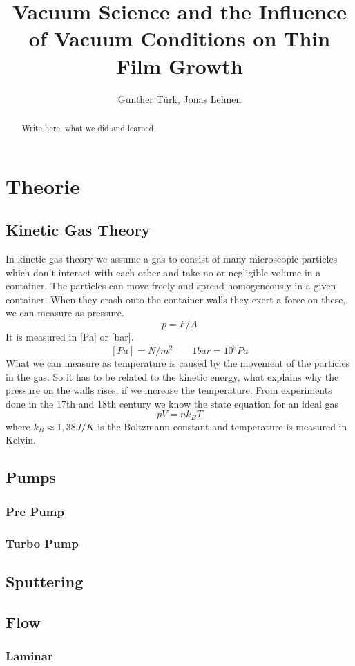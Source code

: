 \documentclass[]{article}
\title{Vacuum Science and the Inﬂuence of Vacuum Conditions on Thin Film Growth}
\author{Gunther Türk, Jonas Lehnen}
\begin{document}
\maketitle
\tableofcontents
\begin{abstract}
Write here, what we did and learned.
\end{abstract}

\section{Theorie}
\subsection{Kinetic Gas Theory}
In kinetic gas theory we assume a gas to consist of many microscopic particles which don't interact with each other and take no or negligible volume in a container. The particles can move freely and spread homogeneously in a given container. When they crash onto the container walls they exert a force on these, we can measure as pressure. 
\[ p=F/A \]
It is measured in [Pa] or [bar].
\[ [Pa]=N/m^{2}     \qquad  1bar=10^{5}Pa		 \]
What we can measure as temperature is caused by the movement of the particles in the gas. So it has to be related to the kinetic energy, what explains why the pressure on the walls rises, if we increase the temperature. From experiments done in the 17th and 18th century we know the state equation for an ideal gas
\[ pV=nk_{B} T\]
 where $k_{B}\approx1,38J/K$ is the Boltzmann constant and temperature is measured in Kelvin. 


\subsection{Pumps}
\subsubsection{Pre Pump}
\subsubsection{Turbo Pump}
\subsection{Sputtering}
\subsection{Flow}
\subsubsection{Laminar}
\end{document}
